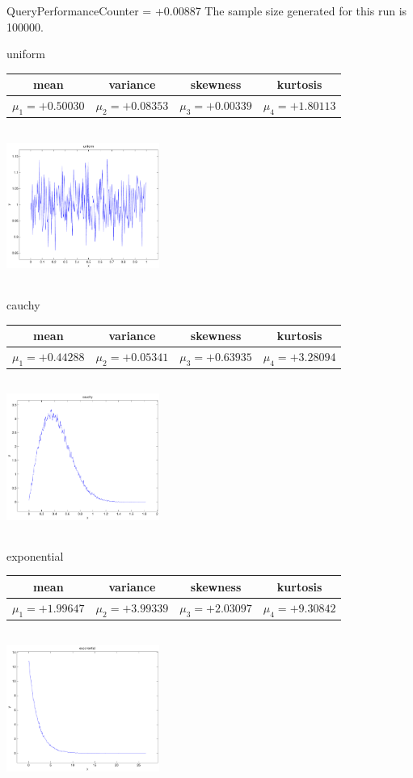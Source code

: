 \documentclass[9pt]{article}
\theoremstyle{plain}
\theoremstyle{definition}
\theoremstyle{remark}
\numberwithin{equation}{section}
\begin{document}
QueryPerformanceCounter  =  +0.00887
The sample size generated for this run is 100000.

\newpage
uniform \begin{tabular}{|c|c|c|c|}  mean & variance & skewness & kurtosis \\  \hline
$\mu_1 = +0.50030$ & $\mu_2 = +0.08353$ & $\mu_3 = +0.00339$ & $\mu_4 =+1.80113$ \\
\end{tabular}

\includegraphics[width=5cm,height=5cm]{uniform.pdf}

cauchy \begin{tabular}{|c|c|c|c|}  mean & variance & skewness & kurtosis \\  \hline
$\mu_1 = +0.44288$ & $\mu_2 = +0.05341$ & $\mu_3 = +0.63935$ & $\mu_4 =+3.28094$ \\
\end{tabular}

\includegraphics[width=5cm,height=5cm]{cauchy.pdf}

exponential \begin{tabular}{|c|c|c|c|}  mean & variance & skewness & kurtosis \\  \hline
$\mu_1 = +1.99647$ & $\mu_2 = +3.99339$ & $\mu_3 = +2.03097$ & $\mu_4 =+9.30842$ \\
\end{tabular}

\includegraphics[width=5cm,height=5cm]{exponential.pdf}
\end{document}
